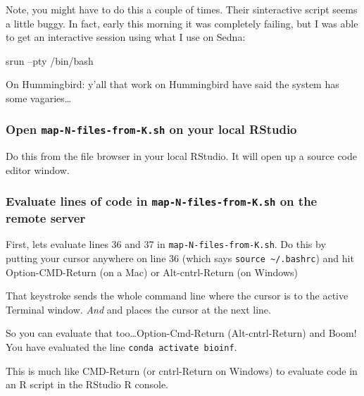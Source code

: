\documentclass[]{krantz}
\makeatletter
\newenvironment{Shaded}{\begin{snugshade}}{\end{snugshade}}
\newcommand{\ExtensionTok}[1]{#1}
\newcommand{\NormalTok}[1]{#1}
\newenvironment{kframe}{%
\medskip{}
\setlength{\fboxsep}{.8em}
 \def\at@end@of@kframe{}%
 \ifinner\ifhmode%
  \def\at@end@of@kframe{\end{minipage}}%
  \begin{minipage}{\columnwidth}%
 \fi\fi%
 \def\FrameCommand##1{\hskip\@totalleftmargin \hskip-\fboxsep
 \colorbox{shadecolor}{##1}\hskip-\fboxsep
     \hskip-\linewidth \hskip-\@totalleftmargin \hskip\columnwidth}%
 \MakeFramed {\advance\hsize-\width
   \@totalleftmargin\z@ \linewidth\hsize
   \@setminipage}}%
 {\par\unskip\endMakeFramed%
 \at@end@of@kframe}
\renewenvironment{Shaded}{\begin{kframe}}{\end{kframe}}
\makeatother
\begin{document}
Note, you might have to do this a couple of times. Their sinteractive script
seems a little buggy. In fact, early this morning it was completely failing,
but I was able to get an interactive session using what I use on Sedna:

\begin{Shaded}
\begin{Highlighting}[]
\ExtensionTok{srun}\NormalTok{ --pty /bin/bash}
\end{Highlighting}
\end{Shaded}

On Hummingbird: y'all that work on Hummingbird have said the system has some vagaries\ldots{}

\hypertarget{open-map-n-files-from-k.sh-on-your-local-rstudio}{%
\subsubsection{\texorpdfstring{Open \texttt{map-N-files-from-K.sh} on your local RStudio}{Open map-N-files-from-K.sh on your local RStudio}}\label{open-map-n-files-from-k.sh-on-your-local-rstudio}}

Do this from the file browser in your local RStudio. It will open up a source code editor window.

\hypertarget{evaluate-lines-of-code-in-map-n-files-from-k.sh-on-the-remote-server}{%
\subsubsection{\texorpdfstring{Evaluate lines of code in \texttt{map-N-files-from-K.sh} on the remote server}{Evaluate lines of code in map-N-files-from-K.sh on the remote server}}\label{evaluate-lines-of-code-in-map-n-files-from-k.sh-on-the-remote-server}}

First, lets evaluate lines 36 and 37 in \texttt{map-N-files-from-K.sh}. Do this
by putting your cursor anywhere on line 36 (which says \texttt{source\ \textasciitilde{}/.bashrc})
and hit Option-CMD-Return (on a Mac) or Alt-cntrl-Return (on Windows)

That keystroke sends the whole command line where the cursor is to the
active Terminal window. \emph{And} and places the cursor at the next line.

So you can evaluate that too\ldots{}Option-Cmd-Return (Alt-cntrl-Return) and
Boom! You have evaluated the line \texttt{conda\ activate\ bioinf}.

This is much like CMD-Return (or cntrl-Return on Windows) to evaluate code in an
R script in the RStudio R console.
\end{document}
